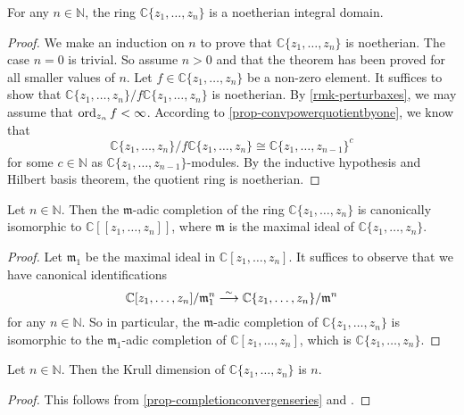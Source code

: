 \begin{thm}\label{thm-localringnoetherian}
    For any $n\in \mathbb{N}$, the ring $\mathbb{C}\{ z_1,\ldots,z_n \}$ is a noetherian integral domain.
\end{thm}
\begin{proof}
    We make an induction on $n$ to prove that $\mathbb{C}\{ z_1,\ldots,z_n \}$ is noetherian. The case $n=0$ is trivial. So assume $n>0$ and that the theorem has been proved for all smaller values of $n$. Let $f\in\mathbb{C}\{ z_1,\ldots,z_n \}$ be a non-zero element. It suffices to show that $\mathbb{C}\{ z_1,\ldots,z_n \}/f\mathbb{C}\{ z_1,\ldots,z_n \}$ is noetherian. By \cref{rmk-perturbaxes}, we may assume that $\operatorname{ord}_{z_n}f<\infty$.
    According to \cref{prop-convpowerquotientbyone}, we know that 
    \[
        \mathbb{C}\{ z_1,\ldots,z_n \}/f\mathbb{C}\{ z_1,\ldots,z_n \}\cong \mathbb{C}\{ z_1,\ldots,z_{n-1} \}^c
    \]
    for some $c\in \mathbb{N}$ as $\mathbb{C}\{ z_1,\ldots,z_{n-1} \}$-modules. By the inductive hypothesis and Hilbert basis theorem, the quotient ring is noetherian.
\end{proof}


\begin{proposition}\label{prop-completionconvergenseries}
    Let $n\in \mathbb{N}$. Then the $\mathfrak{m}$-adic completion of the ring  $\mathbb{C}\{ z_1,\ldots,z_n \}$ is canonically isomorphic to $\mathbb{C}[[ z_1,\ldots,z_n ]]$, where $\mathfrak{m}$ is the maximal ideal of $\mathbb{C}\{ z_1,\ldots,z_n \}$. 
\end{proposition}
\begin{proof}
    Let $\mathfrak{m}_1$ be the maximal ideal in $\mathbb{C}[z_1,\ldots,z_n]$. It suffices to observe that we have canonical identifications
    \[
        \mathbb{C}[z_1,\ldots,z_n]/\mathfrak{m}_1^n\stackrel{\sim}{\longrightarrow} \mathbb{C}\{ z_1,\ldots,z_n\}/\mathfrak{m}^n
    \]
    for any $n\in \mathbb{N}$. So in particular, the $\mathfrak{m}$-adic completion of $\mathbb{C}\{ z_1,\ldots,z_n \}$ is isomorphic to the $\mathfrak{m}_1$-adic completion of $\mathbb{C}[z_1,\ldots,z_n]$, which is $\mathbb{C}\{ z_1,\ldots,z_n \}$.
\end{proof}

\begin{corollary}
    Let $n\in \mathbb{N}$. Then the Krull dimension of $\mathbb{C}\{ z_1,\ldots,z_n \}$ is $n$.
\end{corollary}
\begin{proof}
    This follows from \cref{prop-completionconvergenseries} and \cite[\href{https://stacks.math.columbia.edu/tag/07NV}{Tag 07NV}]{stacks-project}.
\end{proof}

